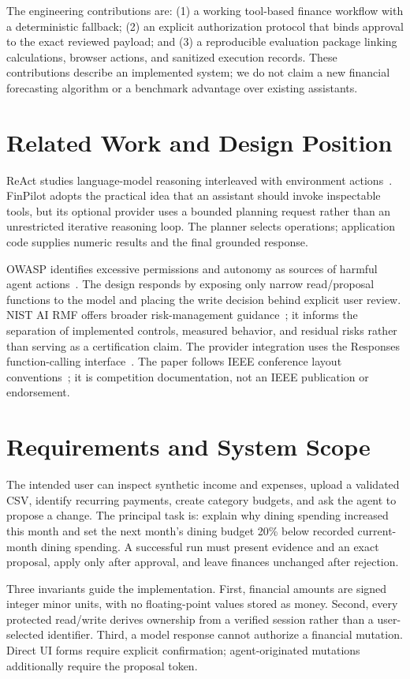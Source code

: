 \documentclass[conference,a4paper]{IEEEtran}
\begin{document}
The engineering contributions are: (1) a working tool-based finance workflow with a deterministic fallback; (2) an explicit authorization protocol that binds approval to the exact reviewed payload; and (3) a reproducible evaluation package linking calculations, browser actions, and sanitized execution records. These contributions describe an implemented system; we do not claim a new financial forecasting algorithm or a benchmark advantage over existing assistants.

\section{Related Work and Design Position}
ReAct studies language-model reasoning interleaved with environment actions~\cite{react}. FinPilot adopts the practical idea that an assistant should invoke inspectable tools, but its optional provider uses a bounded planning request rather than an unrestricted iterative reasoning loop. The planner selects operations; application code supplies numeric results and the final grounded response.

OWASP identifies excessive permissions and autonomy as sources of harmful agent actions~\cite{owaspagency}. The design responds by exposing only narrow read/proposal functions to the model and placing the write decision behind explicit user review. NIST AI RMF offers broader risk-management guidance~\cite{nist}; it informs the separation of implemented controls, measured behavior, and residual risks rather than serving as a certification claim. The provider integration uses the Responses function-calling interface~\cite{openai}. The paper follows IEEE conference layout conventions~\cite{ieeetemplate}; it is competition documentation, not an IEEE publication or endorsement.

\section{Requirements and System Scope}
The intended user can inspect synthetic income and expenses, upload a validated CSV, identify recurring payments, create category budgets, and ask the agent to propose a change. The principal task is: explain why dining spending increased this month and set the next month's dining budget 20\% below recorded current-month dining spending. A successful run must present evidence and an exact proposal, apply only after approval, and leave finances unchanged after rejection.

Three invariants guide the implementation. First, financial amounts are signed integer minor units, with no floating-point values stored as money. Second, every protected read/write derives ownership from a verified session rather than a user-selected identifier. Third, a model response cannot authorize a financial mutation. Direct UI forms require explicit confirmation; agent-originated mutations additionally require the proposal token.
\end{document}
